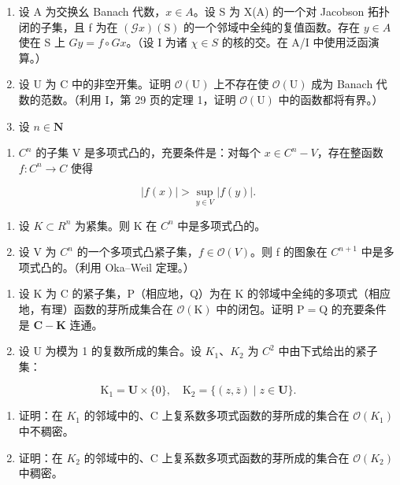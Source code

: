 \begin{enumerate}
\def\labelenumi{\arabic{enumi})}
\setcounter{enumi}{10}
\item
  设 A 为交换幺 Banach 代数，\(x \in A\)。设 S 为 X(A) 的一个对 Jacobson 拓扑闭的子集，且 f 为在 \((\mathcal{G}x)(\mathrm{S})\) 的一个邻域中全纯的复值函数。存在 \(y \in A\) 使在 S 上 \(Gy = f \circ Gx\)。（设 I 为诸 \(\chi \in S\) 的核的交。在 A/I 中使用泛函演算。）
\item
  设 U 为 C 中的非空开集。证明 \(\mathcal{O}(\mathrm{U})\) 上不存在使 \(\mathcal{O}(\mathrm{U})\) 成为 Banach 代数的范数。（利用 I，第 29 页的定理 1，证明 \(\mathcal{O}(\mathrm{U})\) 中的函数都将有界。）
\item
  设 \(n\in \mathbf{N}\)
\end{enumerate}

\begin{enumerate}
\def\labelenumi{\alph{enumi})}
\tightlist
\item
  \(C^{n}\) 的子集 V 是多项式凸的，充要条件是：对每个 \(x \in C^{n} - V\)，存在整函数 \(f: C^{n} \to C\) 使得
\end{enumerate}

\[
| f (x) | > \sup _ {y \in V} | f (y) |.
\]

\begin{enumerate}
\def\labelenumi{\alph{enumi})}
\setcounter{enumi}{1}
\item
  设 \(K \subset R^{n}\) 为紧集。则 K 在 \(C^{n}\) 中是多项式凸的。
\item
  设 V 为 \(C^{n}\) 的一个多项式凸紧子集，\(f \in \mathcal{O}(V)\)。则 f 的图象在 \(C^{n+1}\) 中是多项式凸的。（利用 Oka–Weil 定理。）
\end{enumerate}

\begin{enumerate}
\def\labelenumi{\arabic{enumi})}
\setcounter{enumi}{13}
\item
  设 K 为 C 的紧子集，P（相应地，Q）为在 K 的邻域中全纯的多项式（相应地，有理）函数的芽所成集合在 \(\mathcal{O}(\mathrm{K})\) 中的闭包。证明 \(\mathrm{P} = \mathrm{Q}\) 的充要条件是 \(\mathbf{C} - \mathbf{K}\) 连通。
\item
  设 U 为模为 1 的复数所成的集合。设 \(K_{1}\)、\(K_{2}\) 为 \(C^{2}\) 中由下式给出的紧子集：
\end{enumerate}

\[
\mathrm{K} _ {1} = \mathbf {U} \times \{0 \}, \quad \mathrm{K} _ {2} = \{(z, \overline {{z}}) \mid z \in \mathbf {U} \}.
\]

\begin{enumerate}
\def\labelenumi{\alph{enumi})}
\item
  证明：在 \(K_{1}\) 的邻域中的、C 上复系数多项式函数的芽所成的集合在 \(\mathcal{O}(K_{1})\) 中不稠密。
\item
  证明：在 \(K_{2}\) 的邻域中的、C 上复系数多项式函数的芽所成的集合在 \(\mathcal{O}(K_{2})\) 中稠密。
\end{enumerate}

